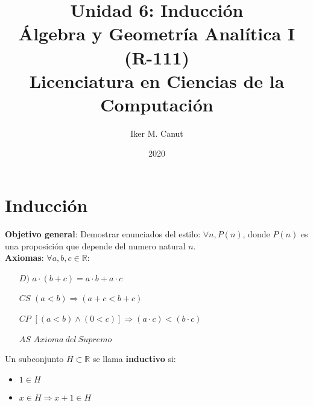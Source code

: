 \documentclass[11pt,a4paper]{article}
\author{Iker M. Canut}
\title{Unidad 6: Inducci\'on\\\'Algebra y Geometr\'ia Anal\'itica I (R-111)\\Licenciatura en Ciencias de la Computaci\'on}
\date{2020}
\begin{document}
\maketitle
\newpage
\section{Inducci\'on}
\textbf{Objetivo general}: Demostrar enunciados del estilo: $\forall n, P(n)$, donde $P(n)$ es una proposici\'on que depende del numero natural $n$.\\

\textbf{Axiomas}: $\forall a,b,c \in \mathbb{R}$:
\begin{enumerate}
\item [$D)$] $a \cdot (b + c) = a \cdot b + a \cdot c$
\item [$CS$] $(a < b) \Rightarrow (a+c < b+c)$
\item [$CP$] $[(a < b) \land (0 < c)] \Rightarrow (a \cdot c) < (b \cdot c)$
\item [$AS$] $Axioma\ del\ Supremo$
\end{enumerate}

\noindent \dotfill

Un subconjunto $H \subset \mathbb{R}$ se llama \textbf{inductivo} si:
\begin{itemize}
\item $1 \in H$
\item $x \in H \Rightarrow x+1 \in H$
\end{itemize}
\end{document}
